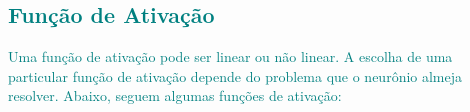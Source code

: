 \documentclass{automatextcc}
\newcommand{\nico}[1]{\textcolor{teal}{#1}}
\newcommand{\pumi}[1]{\textcolor{red}{#1}}
\begin{document}
\subsection{\nico{Função de Ativação}}
\nico{
Uma função de ativação pode ser linear ou não linear. A escolha de uma particular função de ativação depende do problema que o neurônio almeja resolver. Abaixo, seguem algumas funções de ativação:}


\end{document}
